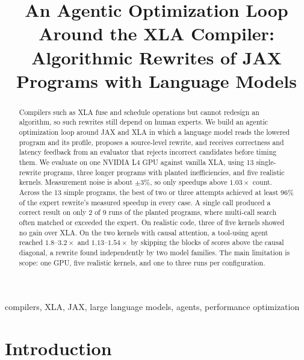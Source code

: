 \documentclass[conference]{IEEEtran}
\begin{document}
\title{An Agentic Optimization Loop Around the XLA Compiler:\\
Algorithmic Rewrites of JAX Programs with Language Models}

\author{
}

\maketitle

\begin{abstract}
Compilers such as XLA fuse and schedule operations but cannot redesign an
algorithm, so such rewrites still depend on human experts. We build an
agentic optimization loop around JAX and XLA in which a language model reads
the lowered program and its profile, proposes a source-level rewrite, and
receives correctness and latency feedback from an evaluator that rejects
incorrect candidates before timing them. We evaluate on one NVIDIA L4 GPU
against vanilla XLA, using 13 single-rewrite programs, three longer programs
with planted inefficiencies, and five realistic kernels. Measurement noise
is about $\pm3\%$, so only speedups above $1.03\times$ count. Across the 13 simple programs, the best of two or three attempts achieved
at least 96\% of the expert rewrite's measured speedup in every case.
A single call produced a
correct result on only 2 of 9 runs of the planted programs, where multi-call
search often matched or exceeded the expert. On realistic code, three of
five kernels showed no gain over XLA. On the two kernels with causal
attention, a tool-using agent reached $1.8$--$3.2\times$ and
$1.13$--$1.54\times$ by skipping the blocks of scores above the causal
diagonal, a rewrite found independently by two model families. The main limitation is
scope: one GPU, five realistic kernels, and one to three runs per
configuration.
\end{abstract}

\begin{IEEEkeywords}
compilers, XLA, JAX, large language models, agents, performance optimization
\end{IEEEkeywords}

\section{Introduction}
\end{document}
